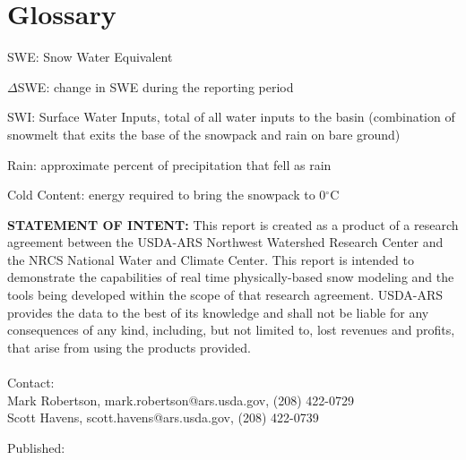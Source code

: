 \documentclass[11pt, oneside]{article}
\begin{document}

\clearpage



\clearpage
\begin{centering}

\end{centering}
\clearpage



\clearpage
\section*{Glossary}

\begin{itemize}
	\setlength\itemsep{0.05em}
	\footnotesize{
		\item[] SWE: Snow Water Equivalent
		\item[] $\Delta$SWE: change in SWE during the reporting period
		\item[] SWI: Surface Water Inputs, total of all water inputs to the basin (combination of snowmelt that exits the base of the snowpack and rain on bare ground)
		\item[] Rain: approximate percent of precipitation that fell as rain
		\item[] Cold Content: energy required to bring the snowpack to 0$^{\circ}$C
	}
\end{itemize}

\vspace{1cm}


\noindent\textbf{STATEMENT OF INTENT:} This report is created as a product of a research agreement between the USDA-ARS Northwest Watershed Research Center and the NRCS National Water and Climate Center. This report is intended to demonstrate the capabilities of real time physically-based snow modeling and the tools being developed within the scope of that research agreement. USDA-ARS provides the data to the best of its knowledge and shall not be liable for any consequences of any kind, including, but not limited to, lost revenues and profits, that arise from using the products provided. \\
\vspace{1cm}  \\
\noindent
Contact: \\
\hspace{2cm} Mark Robertson, mark.robertson@ars.usda.gov, (208) 422-0729 \\
\hspace{2cm} Scott Havens, scott.havens@ars.usda.gov, (208) 422-0739 \\

\par\vspace*{\fill}
\noindent
\footnotesize{
Published: 
}
\end{document}

